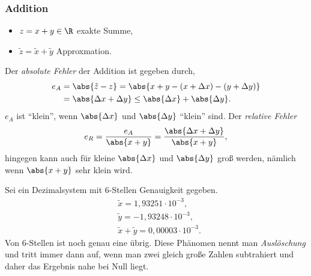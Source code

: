 \subsubsection{Addition}
\begin{itemize}[label=-]
  \item $z=x+y\in\R$ exakte Summe,
  \item $\tilde{z} = \tilde{x}+\tilde{y}$ Approxmation.
\end{itemize}
Der \textit{absolute Fehler} der Addition ist gegeben durch,
\begin{align*}
e_A &= \abs{\tilde{z}-z} = \abs{x+y-(x+\Delta x)-(y+\Delta y)}
\\ &= \abs{\Delta x + \Delta y} \le \abs{\Delta x} + \abs{\Delta y}.
\end{align*}
$e_A$ ist ``klein'', wenn $\abs{\Delta x}$ und $\abs{\Delta y}$ ``klein'' sind.
Der \textit{relative Fehler}
\begin{align*}
e_R = \frac{e_A}{\abs{x+y}} = \frac{\abs{\Delta x+ \Delta y}}{\abs{x+y}},
\end{align*}
hingegen kann auch für kleine $\abs{\Delta x}$ und $\abs{\Delta y}$ groß werden,
nämlich wenn $\abs{x+y}$ sehr klein wird.
\begin{bspn}
Sei ein Dezimalsystem mit $6$-Stellen Genauigkeit gegeben.
\begin{align*}
&\tilde{x} = 1,93251 \cdot 10^{-3},\\
&\tilde{y} = -1,93248 \cdot 10^{-3},\\
&\tilde{x}+\tilde{y} = 0,00003 \cdot 10^{-3}.
\end{align*}
Von $6$-Stellen ist noch genau eine übrig. Diese Phänomen nennt man
\emph{Auslöschung} und tritt immer dann auf, wenn man zwei gleich große
Zahlen subtrahiert und daher das Ergebnis nahe bei Null liegt.\bsphere
\end{bspn}

